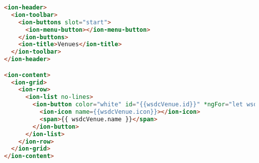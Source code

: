 \begin{lstlisting}[language=html, label={lst:venues.page.html}, caption=venues.page.html]
<ion-header>
  <ion-toolbar>
    <ion-buttons slot="start">
      <ion-menu-button></ion-menu-button>
    </ion-buttons>
    <ion-title>Venues</ion-title>
  </ion-toolbar>
</ion-header>

<ion-content>
  <ion-grid>
    <ion-row>
      <ion-list no-lines>
        <ion-button color="white" id="{{wsdcVenue.id}}" *ngFor="let wsdcVenue of venuesData" (click)="itemTapped(wsdcVenue)">
          <ion-icon name={{wsdcVenue.icon}}></ion-icon>
          <span>{{ wsdcVenue.name }}</span>
        </ion-button>
      </ion-list>
    </ion-row>
  </ion-grid>
</ion-content>

\end{lstlisting}

